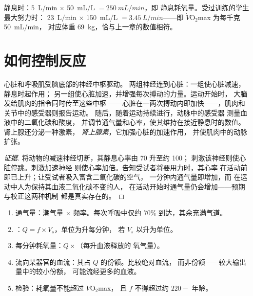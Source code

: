 \begin{example}[核对氧气收支]\label{ex:g10:heart-lungs-effort:fick}
静息时：\qty{5}{L/min} $\times$ \qty{50}{mL/L} $= \qty{250}{mL/min}$，即
静息耗氧量。受过训练的学生最大努力时：
\qty{23}{L/min} $\times$ \qty{150}{mL/L} $= \qty{3.45}{L/min}$——即
$\dot V\!\mathrm{O_2}$max 为每千克 \qty{50}{mL/min}，
对应体重 \qty{69}{kg}，恰与上一章的数值相符。
\end{example}

\section{如何控制反应}

\begin{proposition}[神经和激素调节]\label{prop:g10:heart-lungs-effort:control}
心脏和呼吸肌受脑底部的神经中枢驱动。
两组神经连到心脏：一组使心脏减速，静息时起作用；
另一组使心脏加速，并增强每次搏动的力量。运动开始时，
大脑发给肌肉的指令同时传至这些中枢
——心脏在一两次搏动内即加快——，肌肉和关节中的感受器则报告运动。
随后，随着运动持续进行，动脉中的感受器
测量血液中的二氧化碳和酸度，
并调节通气量和心率，使其维持在接近静息时的数值。
肾上腺还分泌一种激素，
\emph{肾上腺素}，它加强心脏的加速作用，
并使肌肉中的动脉扩张。
\end{proposition}
\begin{proof}[证据]
将动物的减速神经切断，其静息心率由 70 升至约 100；
刺激该神经则使心脏停跳。刺激加速神经
则使心率加倍。告知受试者将要用力时，其心率
在活动前即已上升；让受试者吸入富含二氧化碳的空气，
一分钟内通气量即增加，而
在运动中人为保持其血液二氧化碳不变的人，
在活动开始时通气量仍会增加——预期与校正这两种机制
都是真实存在的。
\end{proof}

\begin{method}[计算氧气的输送]\label{met:g10:heart-lungs-effort:compute}
\begin{enumerate}
  \item 通气量：潮气量 $\times$ 频率。每次呼吸中仅约 70\%
        到达，其余充满气道。
  \item {}：$Q = f \times V_s$，单位为升每分钟，
        若 $V_s$ 以升为单位。
  \item 每分钟耗氧量：$Q \times$（每升血液释放的
        氧气量）。
  \item 流向某器官的血流：其占 $Q$ 的份额。比较绝对血流，
        而非份额——较大输出量中的较小份额，
        可能流经更多的血液。
  \item 检验：耗氧量不能超过 $\dot V\!\mathrm{O_2}$max，
        且 $f$ 不得超过约 $220 - $ 年龄。
\end{enumerate}
\end{method}

